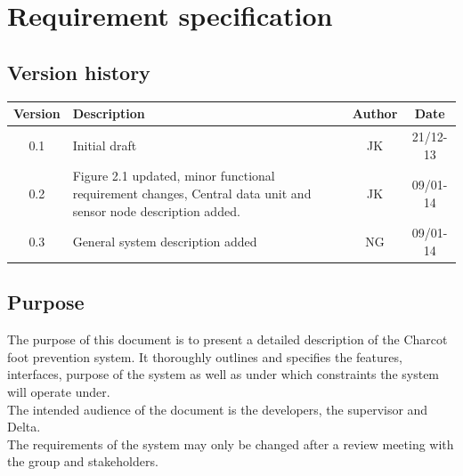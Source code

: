 



\chapter{Requirement specification}

\section{Version history}
\begin{table}[H]
\begin{tabular}{|c|p{9cm}|c|c|}
\hline
Version & Description & Author & Date\\
\hline
0.1 & Initial draft & JK & 21/12-13\\
\hline
0.2 & Figure 2.1 updated, minor functional requirement changes, Central data unit and sensor node description added. & JK & 09/01-14\\
\hline
0.3 & General system description added & NG & 09/01-14\\
\hline
\end{tabular}
\end{table}

\section{Purpose}
The purpose of this document is to present a detailed description of the Charcot foot prevention system. It thoroughly outlines and specifies the features, interfaces, purpose of the system as well as under which constraints the system will operate under.\\
The intended audience of the document is the developers, the supervisor and Delta.\\
The requirements of the system may only be changed after a review meeting with the group and stakeholders.\\

